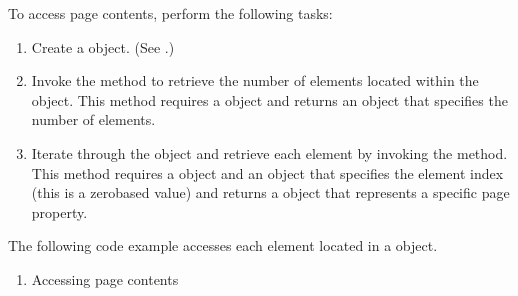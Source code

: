\documentclass[letterpaper,12pt,english,openany,oneside]{sphinxmanual}
\begin{document}
To access page contents, perform the following tasks:
\begin{enumerate}
%
\item {} 
Create a  object. (See .)

\item {} 
Invoke the  method to retrieve the number of elements located within the  object. This method requires a  object and returns an  object that specifies the number of elements.

\item {} 
Iterate through the  object and retrieve each element by invoking the  method. This method requires a  object and an  object that specifies the element index (this is a zero\sphinxhyphen{}based value) and returns a  object that represents a specific page property.

\end{enumerate}

The following code example accesses each element located in a  object.
\begin{enumerate}
%
\item {} 
Accessing page contents

\end{enumerate}

\begin{sphinxVerbatim}[commandchars=\\\{\}]
   
 


        
    


      
    

     
\end{sphinxVerbatim}
\end{document}
